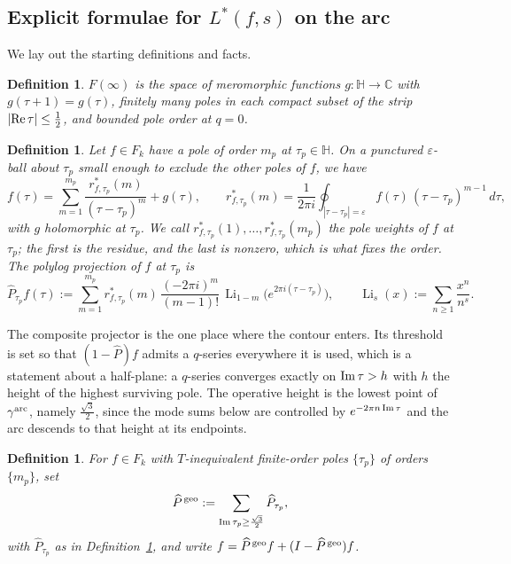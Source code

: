 \documentclass[11pt]{article}
\newtheorem{definition}[theorem]{Definition}
\newcommand{\HH}{\mathbb{H}}
\newcommand{\CC}{\mathbb{C}}
\DeclareMathOperator{\Li}{Li}
\begin{document}
\subsection{Explicit formulae for $L^*(f,s)$ on the arc}\label{sec:arcL}


We lay out the starting definitions and facts.

\begin{definition}\label{def:Finfty_arc}
$F(\infty)$ is the space of meromorphic functions $g:\HH\to\CC$ with $g(\tau+1)=g(\tau)$, finitely
many poles in each compact subset of the strip $|{\rm Re}\,\tau|\le\tfrac12$, and bounded pole
order at $q=0$.
\end{definition}

\begin{definition}\label{def:proj_arc}
Let $f\in F_k$ have a pole of order $m_p$ at $\tau_p\in\HH$. On a punctured $\varepsilon$-ball
about $\tau_p$ small enough to exclude the other poles of $f$, we have
\begin{equation}\label{eq:laurent_arc}
f(\tau)=\sum_{m=1}^{m_p}\frac{r^*_{f,\tau_p}(m)}{(\tau-\tau_p)^{m}}+g(\tau),
\qquad
r^*_{f,\tau_p}(m)=\frac{1}{2\pi i}\oint_{|\tau-\tau_p|=\varepsilon}
f(\tau)\,(\tau-\tau_p)^{m-1}\,d\tau ,
\end{equation}
with $g$ holomorphic at $\tau_p$. We call $r^*_{f,\tau_p}(1),\dots,r^*_{f,\tau_p}(m_p)$ the
\emph{pole weights} of $f$ at $\tau_p$; the first is the residue, and the last is nonzero, which is
what fixes the order. The \emph{polylog projection} of $f$ at $\tau_p$ is
\begin{equation}\label{eq:polyproj_arc}
\widehat P_{\tau_p}f(\tau):=\sum_{m=1}^{m_p} r^*_{f,\tau_p}(m)\,
\frac{(-2\pi i)^m}{(m-1)!}\,\Li_{1-m}\big(e^{2\pi i(\tau-\tau_p)}\big),
\qquad \Li_s(x):=\sum_{n\ge1}\frac{x^{n}}{n^{s}}.
\end{equation}
\end{definition}

The composite projector is the one place where the contour enters. Its threshold is set so that
$(1-\widehat P)f$ admits a $q$-series everywhere it is used, which is a statement about a
half-plane: a $q$-series converges exactly on ${\rm Im}\,\tau>h$ with $h$ the height of the highest
surviving pole. The operative height is the lowest point of $\gamma^{\rm arc}$, namely
$\tfrac{\sqrt3}{2}$, since the mode sums below are controlled by $e^{-2\pi n\,{\rm Im}\,\tau}$ and
the arc descends to that height at its endpoints.

\begin{definition}\label{def:geoproj}
For $f\in F_k$ with $T$-inequivalent finite-order poles $\{\tau_p\}$ of orders $\{m_p\}$, set
\begin{equation}\label{eq:polesplit_arc}
\widehat P^{\,\rm geo}:=\sum_{{\rm Im}\,\tau_p\ge\frac{\sqrt3}{2}}\widehat P_{\tau_p},
\end{equation}
with $\widehat P_{\tau_p}$ as in Definition~\ref{def:proj_arc}, and write
$f=\widehat P^{\,\rm geo}f+(I-\widehat P^{\,\rm geo})f$.
\end{definition}
\end{document}
